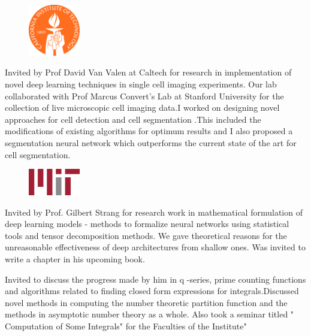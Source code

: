 \documentclass[]{deedy-resume-openfont}
\begin{document}
\begin{minipage}[t]{0.66\textwidth}
\begin{figure}
  \begin{center}
    \includegraphics[width=0.20\textwidth]{caltechlogo.png}
  \end{center}
\end{figure}
Invited by Prof David Van Valen at Caltech for research in implementation of novel deep learning techniques in single cell imaging experiments. Our lab collaborated with Prof Marcus Convert's Lab at Stanford University for the collection of live microscopic cell imaging data.I worked on designing novel approaches for cell detection and cell segmentation .This included the modifications of existing algorithms for optimum results and I also proposed a segmentation neural network which outperforms the current state of the art for cell segmentation. \newline
\sectionsep

\begin{figure}
  \begin{center}
    \includegraphics[width=0.20\textwidth]{mitlogo.png}
  \end{center}
\end{figure}
Invited by Prof. Gilbert Strang for research work in mathematical formulation of deep learning models - methods to formalize neural networks using statistical tools and tensor decomposition methods. We gave theoretical reasons for the unreasonable effectiveness of deep architectures from shallow ones. Was invited to write a chapter in his upcoming book.\newline
\sectionsep

Invited to discuss the progress made by him in q -series, prime counting functions and algorithms related to finding closed form expressions for integrals.Discussed novel methods in computing the number theoretic partition function and the methods in asymptotic  number theory as a whole. Also took a seminar titled " Computation of Some Integrals" for the Faculties of the Institute" \newline
\sectionsep



\end{minipage}
\end{document}
